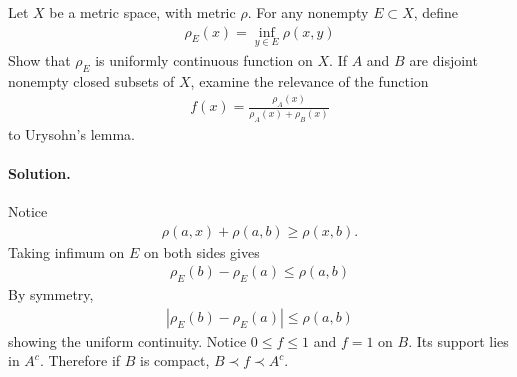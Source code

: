 \documentclass[../main.tex]{subfiles}
\begin{document}
 \begin{exercise}
   Let $ X $ be a metric space, with metric $ \rho $. For any nonempty $ E \subset X $, define
   \begin{align*}
   \rho_E(x) = \inf_{y \in E} \rho(x, y)
   \end{align*}
   Show that $ \rho_E $ is uniformly continuous function on $ X $. If $ A $ and $ B $ are disjoint nonempty closed
   subsets of $ X $, examine the relevance of the function
   \begin{align*}
   f(x) = \frac{\rho_A(x)}{\rho_A(x) + \rho_B(x)}
   \end{align*}
   to Urysohn's lemma.

   \paragraph{Solution. }
   Notice
   \begin{align*}
   \rho(a, x) + \rho(a, b) \ge \rho(x, b).
   \end{align*}
   Taking infimum on $ E $ on both sides gives
   \begin{align*}
   \rho_E(b) - \rho_E(a) \le \rho(a, b)
   \end{align*}
   By symmetry,
   \begin{align*}
   |\rho_E(b) - \rho_E(a)| \le \rho(a, b)
   \end{align*}
   showing the uniform continuity. Notice $ 0 \le f \le 1 $ and $ f = 1 $ on $ B $. Its support lies in $ A^{c} $.
   Therefore if $ B $ is compact, $ B \prec f \prec A^c $.

 \end{exercise}
\end{document}
